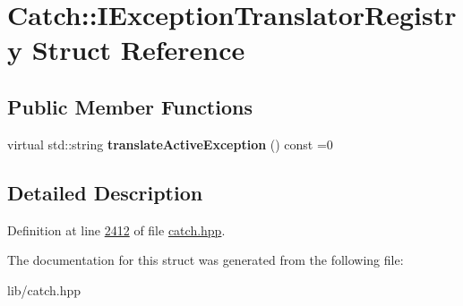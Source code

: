 \hypertarget{structCatch_1_1IExceptionTranslatorRegistry}{}\section{Catch\+::I\+Exception\+Translator\+Registry Struct Reference}
\label{structCatch_1_1IExceptionTranslatorRegistry}
\subsection*{Public Member Functions}
\begin{DoxyCompactItemize}
\item 
\mbox{\label{structCatch_1_1IExceptionTranslatorRegistry_af76ae8c331a17f2a94c9720bc0d686bb}} 
virtual std\+::string {\bfseries translate\+Active\+Exception} () const =0
\end{DoxyCompactItemize}


\subsection{Detailed Description}


Definition at line \mbox{\hyperlink{catch_8hpp_source_l02412}{2412}} of file \mbox{\hyperlink{catch_8hpp_source}{catch.\+hpp}}.



The documentation for this struct was generated from the following file\+:\begin{DoxyCompactItemize}
\item 
lib/catch.\+hpp\end{DoxyCompactItemize}
